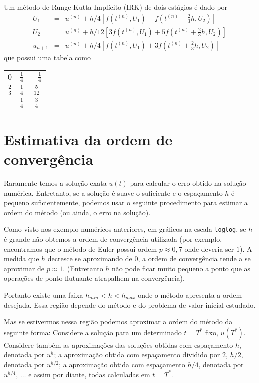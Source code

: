 \begin{ex}
Um método de Runge-Kutta Implícito (IRK) de dois estágios é dado por
\begin{eqnarray}
  U_1 &=&u^{(n)}  + h/4  [ f(t^{(n)},U_1) - f(t^{(n)}+\frac{2}{3}h,U_2)]\\
  U_2 &=&u^{(n)}  + h/12 [3f(t^{(n)},U_1) +5f(t^{(n)}+\frac{2}{3}h,U_2)]\\
  u_{n+1}&=&u^{(n)}  + h/4 [f(t^{(n)},U_1) +3f(t^{(n)}+\frac{2}{3}h,U_2)]
\end{eqnarray}
que possui uma tabela como
\begin{center}
\begin{tabular}{c|cc}
  $0$ & $\frac{1}{4}$ &$-\frac{1}{4}$  \\
  $\frac{2}{3}$ & $\frac{1}{4}$ &$\frac{5}{12}$  \\  \hline
      & $\frac{1}{4}$ &$\frac{3}{4}$
\end{tabular}
\end{center}
\end{ex}




\section{Estimativa da ordem de convergência}

Raramente temos a solução exata $u(t)$ para calcular o erro obtido na solução numérica. Entretanto, se a solução é suave o suficiente e o espaçamento $h$ é pequeno suficientemente, podemos usar o seguinte procedimento para estimar a ordem do método (ou ainda, o erro na solução).

Como visto nos exemplo numéricos anteriores, em gráficos na escala \verb#loglog#, se $h$ é grande não obtemos a ordem de convergência utilizada (por exemplo, encontramos que o método de Euler possui ordem $p\approx 0,7$ onde deveria ser $1$). A medida que $h$ decresce se aproximando de $0$, a ordem de convergência tende a se aproximar de $p\approx 1$. (Entretanto $h$ não pode ficar muito pequeno a ponto que as operações de ponto flutuante atrapalhem na convergência).

Portanto existe uma faixa $h_{min} < h < h_{max}$ onde o método apresenta a ordem desejada. Essa região depende do método e do problema de valor inicial estudado.

Mas se estivermos nessa região podemos aproximar a ordem do método da seguinte forma: Considere a solução para um determinado $t=T^*$ fixo, $u(T^*)$. Considere também as aproximações das soluções obtidas com espaçamento $h$, denotada por $u^{h}$; a aproximação obtida com espaçamento dividido por $2$, $h/2$, denotada por $u^{h/2}$; a aproximação obtida com espaçamento $h/4$, denotada por $u^{h/4}$, $\ldots $ e assim por diante, todas calculadas em $t=T^*$.

